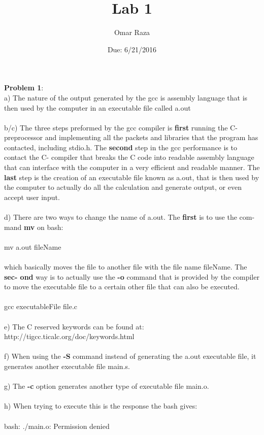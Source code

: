 \documentclass[12pt]{article}
\title{\vspace{-2.0cm} Lab 1}
\author{Omar Raza}
\date{Due: 6/21/2016}
\newcommand{\tab}[0]{\indent \indent}
\begin{document}
\maketitle
\noindent
\textbf{Problem 1}: \\ \tab a) The nature of the output generated by the gcc is assembly language that is then \tab used by the computer in an executable file called a.out\\\\
	\tab b/c) The three steps preformed by the gcc compiler is \textbf{first} running the C-preprocessor \tab and implementing all the packets and libraries that the program has contacted, \tab  including stdio.h.  
    The \textbf{second} step in the gcc performance is to  contact the C- \tab  compiler that breaks the C code into readable assembly language that can interface \tab  with the computer in a very efficient and readable manner. The \textbf{last} step is the  \tab creation of an executable file known as a.out, that is then used by the computer to \tab  actually do all the calculation and generate output, or even accept user input. \\\\
    \tab d) There are two ways to change the name of a.out. The \textbf{first} is to use the com- \tab mand \textbf{mv} on bash:\\\\ \tab \tab mv a.out fileName \\\\ \tab which basically moves the file to another file with the file name fileName. The \textbf{sec- \tab ond} way is to actually use the \textbf{-o} command that is provided by the compiler to move \tab the executable file to a certain other file that can also be executed. \\\\ \tab \tab gcc executableFile file.c \\\\
    	\tab e) The C reserved keywords can be found at: http://tigcc.ticalc.org/doc/keywords.html \\\\
    	\tab f) When using the \textbf{-S} command instead of generating the a.out executable file, it \tab generates another executable file main.s. \\\\
    	\tab g) The \textbf{-c} option generates another type of executable file main.o. \\\\
    	\tab h) When trying to execute this is the response the bash gives: \\\\ \tab \tab bash: ./main.o: Permission denied \\
    	
\end{document}
